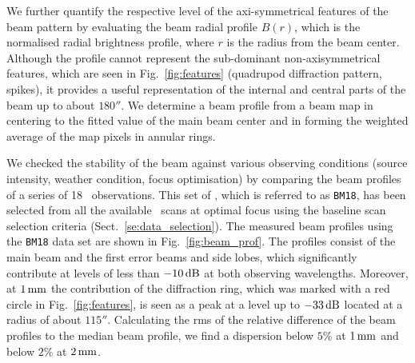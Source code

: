 We further quantify the respective level of the axi-symmetrical
features of the beam pattern by evaluating the beam radial profile
$B(r)$, which is the normalised radial brightness profile,
where $r$ is the radius from the beam center.
Although the profile cannot represent the sub-dominant non-axisymmetrical
features, which are seen in Fig.~\ref{fig:features} (quadrupod
diffraction pattern, spikes), it provides a useful
representation of the internal and central parts of the beam {\lp up to
 about $180''$.} We determine a beam profile from a beam map in centering to
the fitted value of the main beam center and in forming the
weighted average of the map pixels in annular rings.

We checked the stability of the beam against various
observing conditions (source intensity, weather condition, focus
optimisation) by comparing the beam profiles of a series of 18 \bm\
observations.
This set of \bms, which is referred to as {\tt BM18}, has been
selected from all the available \bm\ scans at optimal focus using the
baseline scan selection criteria (Sect.~\ref{se:data_selection}).
The measured beam profiles using the {\tt BM18} data set are shown in
Fig.~\ref{fig:beam_prof}. {\lp The profiles consist of the main beam and
the first error beams and side lobes, which significantly contribute
at levels of less than $-10\,\rm{dB}$ at both observing
wavelengths. Moreover, at $1\,\rm{mm}$ the contribution of the
diffraction ring, which was marked with a red circle in Fig.~\ref{fig:features},
is seen as a peak at a level up to $-33\,\rm{dB}$ located at a radius
of about $115''$.} Calculating the {\lp rms of the relative}
difference of the beam profiles to the median beam profile, we find a
dispersion below $5\%$ at $1\,\rm{mm}$ and below $2\%$ at
$2\,\rm{mm}$.

